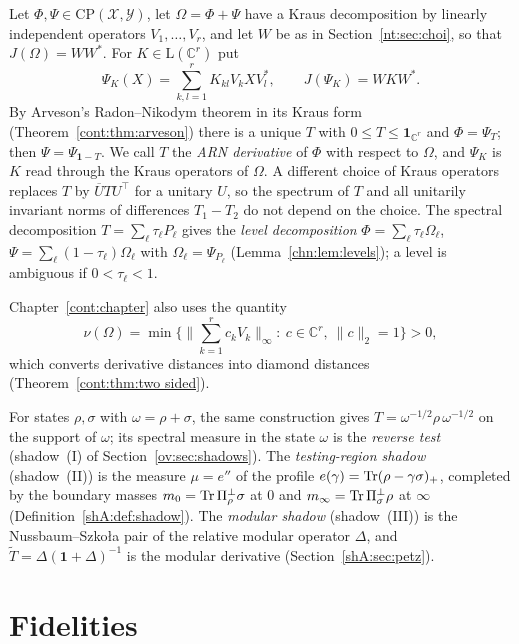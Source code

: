 Let $\Phi,\Psi\in\mathrm{CP}(\mathcal X,\mathcal Y)$, let $\Omega=\Phi+\Psi$ have a Kraus decomposition by linearly independent operators $V_1,\dots,V_r$, and let $W$ be as in Section~\ref{nt:sec:choi}, so that $J(\Omega)=WW^*$. For $K\in\mathrm L(\mathbb C^r)$ put
\[
\Psi_K(X)=\sum_{k,l=1}^rK_{kl}V_kXV_l^*,\qquad J(\Psi_K)=WKW^* .
\]
By Arveson's Radon--Nikodym theorem in its Kraus form \cite{arveson1969subalgebras,Raginsky2003} (Theorem~\ref{cont:thm:arveson}) there is a unique $T$ with $0\le T\le\mathbf 1_{\mathbb C^r}$ and $\Phi=\Psi_T$; then $\Psi=\Psi_{\mathbf 1-T}$. We call $T$ the \emph{ARN derivative} of $\Phi$ with respect to $\Omega$, and $\Psi_K$ is $K$ read through the Kraus operators of $\Omega$. A different choice of Kraus operators replaces $T$ by $\overline UTU^\top$ for a unitary $U$, so the spectrum of $T$ and all unitarily invariant norms of differences $T_1-T_2$ do not depend on the choice. The spectral decomposition $T=\sum_\ell\tau_\ell P_\ell$ gives the \emph{level decomposition} $\Phi=\sum_\ell\tau_\ell\Omega_\ell$, $\Psi=\sum_\ell(1-\tau_\ell)\Omega_\ell$ with $\Omega_\ell=\Psi_{P_\ell}$ (Lemma~\ref{chn:lem:levels}); a level is ambiguous if $0<\tau_\ell<1$.

Chapter~\ref{cont:chapter} also uses the quantity
\[
\nu(\Omega)=\min\Big\{\Big\|\sum_{k=1}^rc_kV_k\Big\|_\infty:\ c\in\mathbb C^r,\ \|c\|_2=1\Big\}>0,
\]
which converts derivative distances into diamond distances (Theorem~\ref{cont:thm:two sided}).

For states $\rho,\sigma$ with $\omega=\rho+\sigma$, the same construction gives $T=\omega^{-1/2}\rho\,\omega^{-1/2}$ on the support of $\omega$; its spectral measure in the state $\omega$ is the \emph{reverse test} (shadow~(I) of Section~\ref{ov:sec:shadows}). The \emph{testing-region shadow} (shadow~(II)) is the measure $\mu=e''$ of the profile $e(\gamma)=\operatorname{Tr}(\rho-\gamma\sigma)_+$, completed by the boundary masses $m_0=\operatorname{Tr}\Pi_\rho^\perp\sigma$ at $0$ and $m_\infty=\operatorname{Tr}\Pi_\sigma^\perp\rho$ at $\infty$ (Definition~\ref{shA:def:shadow}). The \emph{modular shadow} (shadow~(III)) is the Nussbaum--Szko{\l}a pair of the relative modular operator $\Delta$, and $\widetilde T=\Delta(\mathbf 1+\Delta)^{-1}$ is the modular derivative (Section~\ref{shA:sec:petz}).

\section{Fidelities}\label{nt:sec:fidelities}

